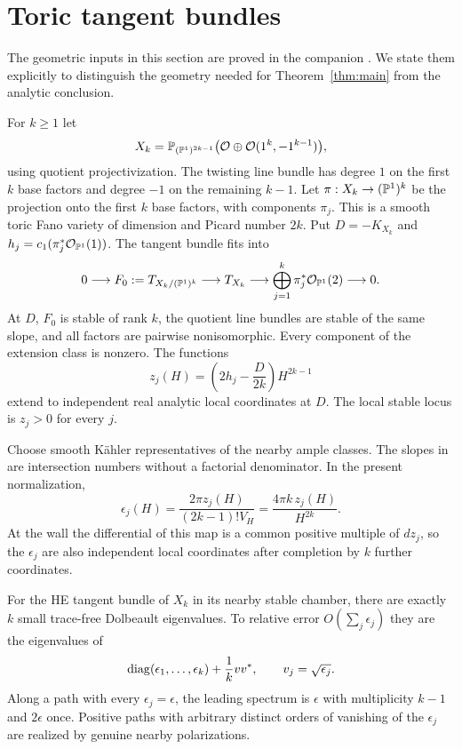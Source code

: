 \section{Toric tangent bundles}
\label{sec:toric}

The geometric inputs in this section are proved in the companion
\cite{Chambers}. We state them explicitly to distinguish the geometry
needed for Theorem~\ref{thm:main} from the analytic conclusion.

For $k\ge1$ let
\[
 X_k=\mathbb P_{(\mathbb P^1)^{2k-1}}
       \bigl(\mathcal O\oplus\mathcal O(1^k,-1^{k-1})\bigr),
\]
using quotient projectivization. The twisting line bundle has degree
$1$ on the first $k$ base factors and degree $-1$ on the remaining
$k-1$. Let $\pi:X_k\to(\mathbb P^1)^k$ be the projection onto the
first $k$ base factors, with components $\pi_j$.
This is a smooth toric Fano variety of dimension and Picard number
$2k$. Put $D=-K_{X_k}$ and $h_j=c_1(\pi_j^*\mathcal O_{\mathbb P^1}(1))$.
The tangent bundle fits into
\begin{equation}\label{eq:toric-extension}
 0\longrightarrow F_0:=T_{X_k/(\mathbb P^1)^k}
 \longrightarrow T_{X_k}
 \longrightarrow\bigoplus_{j=1}^k\pi_j^*\mathcal O_{\mathbb P^1}(2)
 \longrightarrow0.
\end{equation}
At $D$, $F_0$ is stable of rank $k$, the quotient line bundles are
stable of the same slope, and all factors are pairwise nonisomorphic.
Every component of the extension class is nonzero. The functions
\[
 z_j(H)=\left(2h_j-\frac{D}{2k}\right)H^{2k-1}
\]
extend to independent real analytic local coordinates at $D$.
The local stable locus is $z_j>0$ for every $j$.

Choose smooth K\"ahler representatives of the nearby ample classes.
The slopes in \cite{Chambers} are intersection numbers without a
factorial denominator. In the present normalization,
\begin{equation}\label{eq:toric-epsilon}
 \epsilon_j(H)=\frac{2\pi z_j(H)}{(2k-1)!V_H}
              =\frac{4\pi k\,z_j(H)}{H^{2k}}.
\end{equation}
At the wall the differential of this map is a common positive
multiple of $dz_j$, so the $\epsilon_j$ are also independent local
coordinates after completion by $k$ further coordinates.

\begin{corollary}\label{cor:toric}
For the HE tangent bundle of $X_k$ in its nearby stable chamber,
there are exactly $k$ small trace-free Dolbeault eigenvalues. To
relative error $O(\sum_j\epsilon_j)$ they are the eigenvalues of
\[
 \operatorname{diag}(\epsilon_1,\ldots,\epsilon_k)+\frac1k vv^*,
 \qquad v_j=\sqrt{\epsilon_j}.
\]
Along a path with every $\epsilon_j=\epsilon$, the leading spectrum
is $\epsilon$ with multiplicity $k-1$ and $2\epsilon$ once.
Positive paths with arbitrary distinct orders of vanishing of the
$\epsilon_j$ are realized by genuine nearby polarizations.
\end{corollary}

